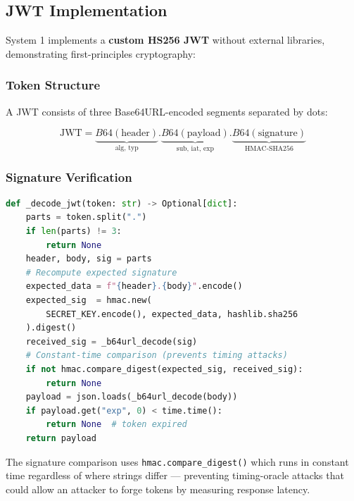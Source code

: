 \documentclass[12pt,a4paper]{article}
\begin{document}
\subsection{JWT Implementation}

System 1 implements a \textbf{custom HS256 JWT} without external libraries,
demonstrating first-principles cryptography:

\subsubsection{Token Structure}

A JWT consists of three Base64URL-encoded segments separated by dots:

\begin{equation}
\text{JWT} = \underbrace{B64(\text{header})}_{\text{alg, typ}} \mathtt{.}
             \underbrace{B64(\text{payload})}_{\text{sub, iat, exp}} \mathtt{.}
             \underbrace{B64(\text{signature})}_{\text{HMAC-SHA256}}
\label{eq:jwt}
\end{equation}

\subsubsection{Signature Verification}

\begin{lstlisting}[language=Python, caption={JWT Signature Verification}]
def _decode_jwt(token: str) -> Optional[dict]:
    parts = token.split(".")
    if len(parts) != 3:
        return None
    header, body, sig = parts
    # Recompute expected signature
    expected_data = f"{header}.{body}".encode()
    expected_sig  = hmac.new(
        SECRET_KEY.encode(), expected_data, hashlib.sha256
    ).digest()
    received_sig = _b64url_decode(sig)
    # Constant-time comparison (prevents timing attacks)
    if not hmac.compare_digest(expected_sig, received_sig):
        return None
    payload = json.loads(_b64url_decode(body))
    if payload.get("exp", 0) < time.time():
        return None  # token expired
    return payload
\end{lstlisting}

\begin{warningbox}[title={Timing Attack Prevention}]
The signature comparison uses \texttt{hmac.compare\_digest()} which runs in
constant time regardless of where strings differ --- preventing timing-oracle
attacks that could allow an attacker to forge tokens by measuring response latency.
\end{warningbox}
\end{document}
